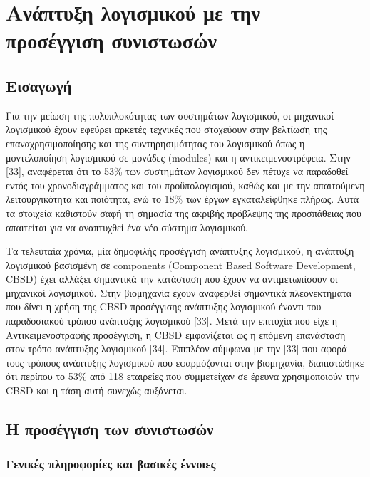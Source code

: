 \chapter{Ανάπτυξη λογισμικού με την προσέγγιση συνιστωσών } %

\label{Chapter4} 

\section{Εισαγωγή}
Για την μείωση της πολυπλοκότητας των συστημάτων λογισμικού, οι μηχανικοί λογισμικού έχουν εφεύρει αρκετές τεχνικές που στοχεύουν στην βελτίωση της επαναχρησιμοποίησης και της συντηρησιμότητας του λογισμικού όπως η μοντελοποίηση λογισμικού σε μονάδες (modules) και η αντικειμενοστρέφεια. Στην [33], αναφέρεται ότι το 53\% των συστημάτων λογισμικού δεν πέτυχε να παραδοθεί εντός του χρονοδιαγράμματος και του προϋπολογισμού, καθώς και με την απαιτούμενη λειτουργικότητα και ποιότητα, ενώ το 18\% των έργων εγκαταλείφθηκε πλήρως. Αυτά τα στοιχεία καθιστούν σαφή τη σημασία της ακριβής πρόβλεψης της προσπάθειας που απαιτείται για να αναπτυχθεί ένα νέο σύστημα λογισμικού. 

	Τα τελευταία χρόνια, μία δημοφιλής προσέγγιση ανάπτυξης λογισμικού, η ανάπτυξη λογισμικού βασισμένη σε components (Component Based Software Development, CBSD) έχει αλλάξει σημαντικά την κατάσταση που έχουν να αντιμετωπίσουν οι μηχανικοί λογισμικού. Στην βιομηχανία έχουν αναφερθεί σημαντικά πλεονεκτήματα που δίνει η χρήση της CBSD προσέγγισης ανάπτυξης λογισμικού έναντι του παραδοσιακού τρόπου ανάπτυξης λογισμικού [33]. Μετά την επιτυχία που είχε η Αντικειμενοστραφής προσέγγιση, η CBSD εμφανίζεται ως η επόμενη επανάσταση στον τρόπο ανάπτυξης λογισμικού [34]. Επιπλέον σύμφωνα με την [33] που αφορά τους τρόπους ανάπτυξης λογισμικού που εφαρμόζονται στην βιομηχανία, διαπιστώθηκε ότι περίπου το 53\% από 118 εταιρείες που συμμετείχαν σε έρευνα χρησιμοποιούν την CBSD και η τάση αυτή συνεχώς αυξάνεται. 
	
\section{Η προσέγγιση των συνιστωσών}

\subsection{Γενικές πληροφορίες και βασικές έννοιες}

